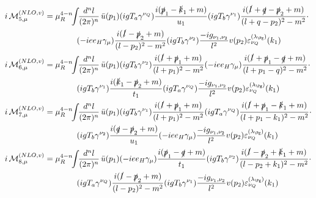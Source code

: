 \begin{align}
i\Md^{(NLO,v)}_{5,\mu} &=\mu_R^{4-n}\!\!\int\!\!\frac{d^nl}{(2\pi)^n}\,\bar u(p_1)(igT_a\gamma^{\nu_Q})\frac{i(\slashed{p}_1-\slashed{k}_1+m)}{u_1}(igT_b\gamma^{\nu_1})\frac{i(\slashed{l}+\slashed{q}-\slashed{p}_2+m)}{(l+q-p_2)^2-m^2}\cdot\nonumber\\
 &\hspace{40pt}(-i e e_H \gamma_\mu)\frac{i(\slashed{l}-\slashed{p}_2+m)}{(l-p_2)^2-m^2}(igT_b\gamma^{\nu_2})\frac{-ig_{\nu_1,\nu_2}}{l^2}v(p_2)\varepsilon^{(\lambda_{\Pg})}_{\nu_Q}(k_1)\\
i\Md^{(NLO,v)}_{6,\mu} &=\mu_R^{4-n}\!\!\int\!\!\frac{d^nl}{(2\pi)^n}\,\bar u(p_1)(igT_b\gamma^{\nu_2})\frac{i(\slashed{l}+\slashed{p}_1+m)}{(l+p_1)^2-m^2}(-i e e_H \gamma_\mu)\frac{i(\slashed{l}+\slashed{p}_1-\slashed{q}+m)}{(l+p_1-q)^2-m^2}\cdot\nonumber\\
 &\hspace{40pt}(igT_b\gamma^{\nu_1})\frac{i(\slashed{k}_1-\slashed{p}_2+m)}{t_1}(igT_a\gamma^{\nu_Q})\frac{-ig_{\nu_1,\nu_2}}{l^2}v(p_2)\varepsilon^{(\lambda_{\Pg})}_{\nu_Q}(k_1)\\
i\Md^{(NLO,v)}_{7,\mu} &=\mu_R^{4-n}\!\!\int\!\!\frac{d^nl}{(2\pi)^n}\,\bar u(p_1)(igT_b\gamma^{\nu_1})\frac{i(\slashed{l}+\slashed{p}_1+m)}{(l+p_1)^2-m^2}(igT_a\gamma^{\nu_Q})\frac{i(\slashed{l}+\slashed{p}_1-\slashed{k}_1+m)}{(l+p_1-k_1)^2-m^2}\cdot\nonumber\\
 &\hspace{40pt}(igT_b\gamma^{\nu_2})\frac{i(\slashed{q}-\slashed{p}_2+m)}{u_1}(-i e e_H \gamma_\mu)\frac{-ig_{\nu_1,\nu_2}}{l^2}v(p_2)\varepsilon^{(\lambda_{\Pg})}_{\nu_Q}(k_1)\\
i\Md^{(NLO,v)}_{8,\mu} &=\mu_R^{4-n}\!\!\int\!\!\frac{d^nl}{(2\pi)^n}\,\bar u(p_1)(-i e e_H \gamma_\mu)\frac{i(\slashed{p}_1-\slashed{q}+m)}{t_1}(igT_b\gamma^{\nu_2})\frac{i(\slashed{l}-\slashed{p}_2+\slashed{k}_1+m)}{(l-p_2+k_1)^2-m^2}\cdot\nonumber\\
 &\hspace{40pt}(igT_a\gamma^{\nu_Q})\frac{i(\slashed{l}-\slashed{p}_2+m)}{(l-p_2)^2-m^2}(igT_b\gamma^{\nu_1})\frac{-ig_{\nu_1,\nu_2}}{l^2}v(p_2)\varepsilon^{(\lambda_{\Pg})}_{\nu_Q}(k_1)
\end{align}

\pagebreak

